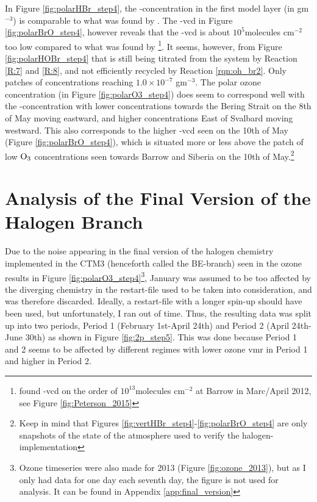 \medskip

In Figure \ref{fig:polarHBr_step4}, the -concentration in the first model layer (in gm$^{-3}$) is comparable to what was found by \cite{barrie}. The -\acrshort{vcd} in Figure \ref{fig:polarBrO_step4}, however reveals that the -\acrshort{vcd} is about $10^5$molecules cm$^{-2}$ too low compared to what was found by \cite{Peterson2015}\footnote{\cite{Peterson2015} found -\acrshort{vcd} on the order of $10^{13}$molecules cm$^{-2}$ at Barrow in Marc/April 2012, see Figure \ref{fig:Peterson_2015}}. It seems, however, from Figure \ref{fig:polarHOBr_step4} that  is still being titrated from the system by Reaction \ref{R:7} and \ref{R:8}, and not efficiently recycled by Reaction \ref{rqn:oh_br2}. Only patches of concentrations reaching $1.0\times10^{-7}$ gm$^{-3}$. The polar ozone concentration (in Figure \ref{fig:polarO3_step4}) does seem to correspond well with the -concentration with lower concentrations towards the Bering Strait on the 8th of May moving eastward, and higher concentrations East of Svalbard moving westward. This also corresponds to the higher -vcd seen on the 10th of May (Figure \ref{fig:polarBrO_step4}), which is situated more or less above the patch of low $\mathrm{O_3}$ concentrations seen towards Barrow and Siberia on the 10th of May.\footnote{Keep in mind that Figures \ref{fig:vertHBr_step4}-\ref{fig:polarBrO_step4} are only snapshots of the state of the atmosphere used to verify the halogen-implementation} 

\section{Analysis of the Final Version of the Halogen Branch}\label{sec:disc_final_Version}

Due to the noise appearing in the final version of the halogen chemistry implemented in the CTM3 (henceforth called the BE-branch) seen in the ozone results in Figure \ref{fig:polarO3_step4}\footnote{Ozone timeseries were also made for 2013 (Figure \ref{fig:ozone_2013}), but as I only had data for one day each seventh day, the figure is not used for analysis. It can be found in Appendix \ref{app:final_version}}, January was assumed to be too affected by the diverging chemistry in the restart-file used to be taken into consideration, and was therefore discarded. Ideally, a restart-file with a longer spin-up should have been used, but unfortunately, I ran out of time. Thus, the resulting data was split up into two periods, Period 1 (February 1st-April 24th) and Period 2 (April 24th-June 30th) as shown in Figure \ref{fig:2p_step5}. This was done because Period 1 and 2 seems to be affected by different regimes with lower ozone \acrshort{vmr} in Period 1 and higher in Period 2.


